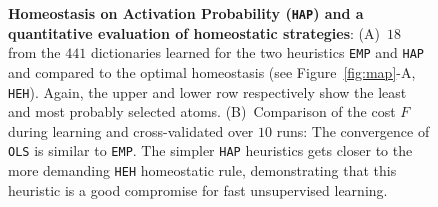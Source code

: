 \documentclass[vision,article,submit,oneauthor,pdftex]{Definitions/mdpi}
\newcommand{\seeFig}[1]{Figure~\ref{fig:#1}}%
\begin{document}
\begin{figure}%
\caption{
{\bf Homeostasis on Activation Probability (\texttt{HAP}) and a quantitative evaluation of homeostatic strategies}: %
 {\sf (A)}~$18$ from the $441$ dictionaries learned for the two heuristics \texttt{EMP} and \texttt{HAP} and compared to the optimal homeostasis (see \seeFig{map}-A, \texttt{HEH}).
 Again, the upper and lower row respectively show the least and most probably selected atoms.  {\sf (B)}~Comparison of the cost $F$ during learning and cross-validated over $10$ runs: The convergence of \texttt{OLS} is similar to \texttt{EMP}. The simpler \texttt{HAP} heuristics gets closer to the more demanding \texttt{HEH} homeostatic rule, demonstrating that this heuristic is a good compromise for fast unsupervised learning.
\label{fig:HAP}}%
\end{figure}%
\end{document}
